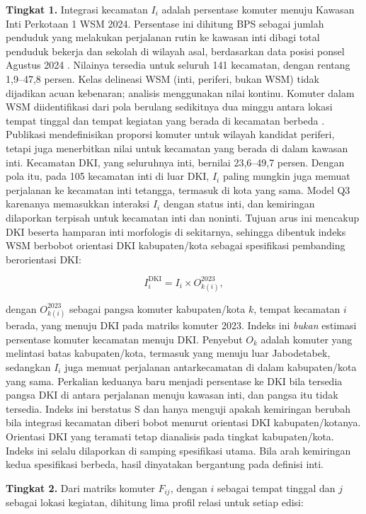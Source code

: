 \documentclass[12pt,a4paper,oneside,openany,indonesian]{report}
\begin{document}
\textbf{Tingkat 1.} Integrasi kecamatan $I_i$ adalah persentase komuter
menuju Kawasan Inti Perkotaan 1 WSM 2024. Persentase ini dihitung BPS
sebagai jumlah penduduk yang melakukan perjalanan rutin ke kawasan inti
dibagi total penduduk bekerja dan sekolah di wilayah asal, berdasarkan
data posisi ponsel Agustus 2024 \parencite{bpswsm2024}. Nilainya
tersedia untuk seluruh 141 kecamatan, dengan rentang 1,9--47,8 persen.
Kelas delineasi WSM (inti, periferi, bukan WSM) tidak dijadikan acuan
kebenaran; analisis menggunakan nilai kontinu. Komuter dalam WSM
diidentifikasi dari pola berulang sedikitnya dua minggu antara lokasi
tempat tinggal dan tempat kegiatan yang berada di kecamatan berbeda
\parencite[hlm.~41--42]{bpswsm2024}. Publikasi mendefinisikan proporsi
komuter untuk wilayah kandidat periferi, tetapi juga menerbitkan nilai
untuk kecamatan yang berada di dalam kawasan inti. Kecamatan DKI, yang
seluruhnya inti, bernilai 23,6--49,7 persen. Dengan pola itu, pada 105 kecamatan inti di luar DKI, $I_i$ paling mungkin juga memuat perjalanan
ke kecamatan inti tetangga, termasuk di kota yang sama. Model Q3
karenanya memasukkan interaksi $I_i$ dengan status inti, dan kemiringan
dilaporkan terpisah untuk kecamatan inti dan noninti. Tujuan arus ini
mencakup DKI beserta hamparan inti morfologis di sekitarnya, sehingga
dibentuk indeks WSM berbobot orientasi DKI kabupaten/kota sebagai
spesifikasi pembanding berorientasi DKI:

\[
I^{\mathrm{DKI}}_i = I_i \times O_{k(i)}^{2023},
\]

\noindent dengan $O_{k(i)}^{2023}$ sebagai pangsa komuter
kabupaten/kota $k$, tempat kecamatan $i$ berada, yang menuju DKI pada
matriks komuter 2023. Indeks ini \emph{bukan} estimasi persentase
komuter kecamatan menuju DKI. Penyebut $O_k$ adalah komuter yang
melintasi batas kabupaten/kota, termasuk yang menuju luar Jabodetabek,
sedangkan $I_i$ juga memuat perjalanan antarkecamatan di dalam
kabupaten/kota yang sama. Perkalian keduanya baru menjadi persentase ke
DKI bila tersedia pangsa DKI di antara perjalanan menuju kawasan inti,
dan pangsa itu tidak tersedia. Indeks ini berstatus S dan hanya menguji
apakah kemiringan berubah bila integrasi kecamatan diberi bobot menurut
orientasi DKI kabupaten/kotanya. Orientasi DKI yang teramati tetap
dianalisis pada tingkat kabupaten/kota. Indeks ini selalu dilaporkan di samping spesifikasi utama. Bila arah
kemiringan kedua spesifikasi berbeda, hasil dinyatakan bergantung pada
definisi inti.

\textbf{Tingkat 2.} Dari matriks komuter $F_{ij}$, dengan $i$ sebagai
tempat tinggal dan $j$ sebagai lokasi kegiatan, dihitung lima profil
relasi untuk setiap edisi:
\end{document}
